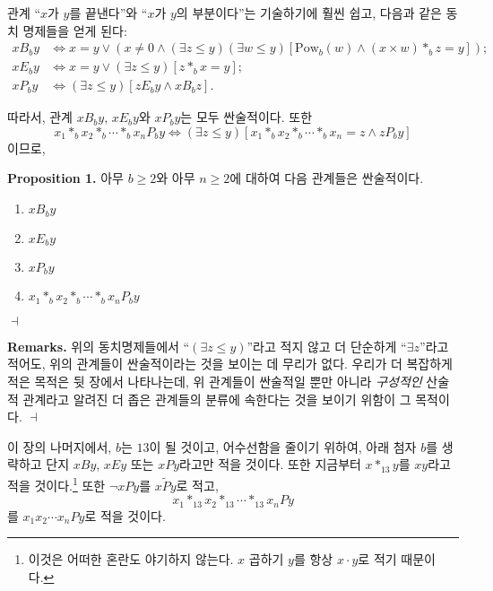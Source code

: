 \documentclass[12pt]{paper}
\newenvironment{context}[1][]
{ \noindent \textbf{{#1}.} }
{ \hfill $ \dashv $ }
\begin{document}
관계 ``$x$가 $y$를 끝낸다''와 ``$x$가 $y$의 부분이다''는 기술하기에 훨씬 쉽고, 다음과 같은 동치 명제들을 얻게 된다:
\begin{align*}
x B_{b} y & \iff x = y \lor \left( x \ne 0 \land \left( \exists z \le y \right) \left( \exists w \le y \right) \left[ \mathrm{Pow}_{b} \left( w \right) \land \left( x \times w \right) *_{b} z = y \right] \right) ; \\
x E_{b} y & \iff x = y \lor \left( \exists z \le y \right) \left[ z *_{b} x = y \right] ; \\
x P_{b} y & \iff \left( \exists z \le y \right) \left[ z E_{b} y \land x B_{b} z \right] .
\end{align*}

따라서, 관계 $x B_{b} y$, $x E_{b} y$와 $x P_{b} y$는 모두 싼술적이다. 또한
$$ x_{1} *_{b} x_{2} *_{b} \cdots *_{b} x_{n} P_{b} y \iff \left( \exists z \le y \right) \left[ x_{1} *_{b} x_{2} *_{b} \cdots *_{b} x_{n} = z \land z P_{b} y \right] $$이므로,

\begin{context}[Proposition 1]
아무 $b \ge 2$와 아무 $n \ge 2$에 대하여 다음 관계들은 싼술적이다. 
\begin{enumerate}
\item $x B_{b} y$
\item $x E_{b} y$
\item $x P_{b} y$
\item $x_{1} *_{b} x_{2} *_{b} \cdots *_{b} x_{n} P_{b} y$
\end{enumerate} 
\end{context}

\begin{context}[Remarks]
위의 동치명제들에서 ``$\left( \exists z \le y \right)$''라고 적지 않고 더 단순하게 ``$\exists z$''라고 적어도,
위의 관계들이 싼술적이라는 것을 보이는 데 무리가 없다. 우리가 더 복잡하게 적은 목적은 뒷 장에서 나타나는데,
위 관계들이 싼술적일 뿐만 아니라 \textit{구성적인} 산술적 관계라고 알려진 더 좁은 관계들의 분류에 속한다는 것을 보이기 위함이 그 목적이다.
\end{context}

이 장의 나머지에서, $b$는 $13$이 될 것이고, 어수선함을 줄이기 위하여, 아래 첨자 $b$를 생략하고 단지 $x B y$, $x E y$ 또는 $x P y$라고만 적을 것이다.
또한 지금부터 $x *_{13} y$를 $x y$라고 적을 것이다.\footnote
{
이것은 어떠한 혼란도 야기하지 않는다. $x$ 곱하기 $y$를 항상 $x \cdot y$로 적기 때문이다.
}
또한 $\lnot x P y$를 $x \widetilde{P} y$로 적고, $$ x_1 *_{13} x_2 *_{13} \cdots *_{13} x_{n} P y $$를 $x_1 x_2 \cdots x_{n} P y$로 적을 것이다. 
\end{document}
